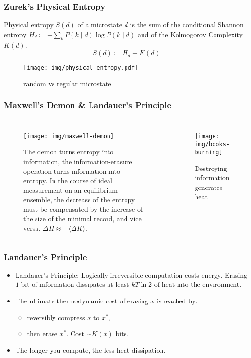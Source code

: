 \documentclass[UTF8,11pt,colorlinks,compress,openany]{beamer}%
\begin{document}
\begin{frame}\frametitle{Zurek's Physical Entropy}
\setlength\abovedisplayskip{0pt}
\setlength\belowdisplayskip{0pt}
\begin{definition}
Physical entropy $S(d)$ of a microstate $d$ is the sum of the conditional Shannon entropy $H_d\coloneqq -\sum\limits_k P(k\mid d)\log P(k\mid d)$ and of the Kolmogorov Complexity $K(d)$.
\[S(d)\coloneqq H_d+K(d)\]
\end{definition}
\begin{figure}[H]
	\begin{center}
		\texttt{[image: img/physical-entropy.pdf]}\caption{random vs regular microstate}
	\end{center}
\end{figure}
\end{frame}

\begin{frame}\frametitle{Maxwell's Demon \& Landauer's Principle}
\begin{columns}
\begin{figure}[H]
\texttt{[image: img/maxwell-demon]}\caption{The demon turns entropy into information, the information-erasure operation turns information into entropy. In the course of ideal measurement on an equilibrium ensemble, the decrease of the entropy must be compensated by the increase of the size of the minimal record, and vice versa. $\Delta H\approx-\langle\Delta K\rangle$.}
\end{figure}
\begin{figure}[H]
\texttt{[image: img/books-burning]}\caption{\tiny Destroying information generates heat}
\end{figure}
\end{columns}
\end{frame}

\begin{frame}\frametitle{Landauer's Principle}
\begin{itemize}
	\item Landauer's Principle: Logically irreversible computation costs energy. Erasing $1$ bit of information dissipates at least $kT\ln2$ of heat into the environment.
	\item The ultimate thermodynamic cost of erasing $x$ is reached by:
	\begin{itemize}
		\item reversibly compress $x$ to $x^*$,
		\item then erase $x^*$. Cost $\sim K(x)$ bits.
	\end{itemize}
	\item The longer you compute, the less heat dissipation.
\end{itemize}
\end{frame}
\end{document}
